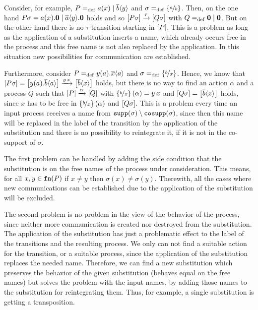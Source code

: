 Consider, for example, $P=_{\mathrm{def}}a(x) \mid \overline{b}\langle y\rangle$ and $\sigma=_{\mathrm{def}}\left\{\nicefrac{a}{b}\right\}$. Then, on the one hand $P\sigma=a(x).\mathbf{0} \mid \overline{a}\langle y\rangle.\mathbf{0}$ holds and so $\left[P\sigma\right]\xrightarrow{\tau}\left[Q\sigma\right]$ with $Q=_{\mathrm{def}}\mathbf{0} \mid \mathbf{0}$. But on the other hand there is no $\tau$ transition starting in $\left[P\right]$. This is a problem as long as the application of a substitution inserts a name, which already occurs free in the process and this free name is not also replaced by the application. In this situation new possibilities for communication are established.

Furthermore, consider $P=_{\mathrm{def}}y(a).\overline{x}\langle a\rangle$ and $\sigma=_{\mathrm{def}}\left\{\nicefrac{b}{x}\right\}$. Hence, we know that $\left[P\sigma\right]=\left[y(a).\overline{b}\langle a\rangle\right]\xrightarrow{y\,x}\left[\overline{b}\langle x\rangle\right]$ holds, but there is no way to find an action $\alpha$ and a process $Q$ such that $\left[P\right]\xrightarrow{\alpha}\left[Q\right]$ with $\left\{\nicefrac{b}{x}\right\}(\alpha)=y\,x$ and $\left[Q\sigma\right]=\left[\overline{b}\langle x\rangle\right]$ holds, since $x$ has to be free in $\left\{\nicefrac{b}{x}\right\}(\alpha)$ and $\left[Q\sigma\right]$. This is a problem every time an input process receives a name from $\mathtt{supp}(\sigma)\setminus\mathtt{cosupp}(\sigma)$, since then this name will be replaced in the label of the transition by the application of the substitution and there is no possibility to reintegrate it, if it is not in the co-support of $\sigma$.

The first problem can be handled by adding the side condition that the substitution is  on the free names of the process under consideration. This means, for all $x,y\in\mathtt{fn}(P)$ if $x\neq{}y$ then $\sigma(x)\neq\sigma(y)$. Therewith, all the cases where new communications can be established due to the application of the substitution will be excluded.

The second problem is no problem in the view of the behavior of the process, since neither more communication is created nor destroyed from the substitution. The application of the substitution has just a problematic effect to the label of the transitions and the resulting process. We only can not find a suitable action for the transition, or a suitable process, since the application of the substitution replaces the needed name. Therefore, we can find a new substitution which preserves the behavior of the given substitution (behaves equal on the free names) but solves the problem with the input names, by adding those names to the substitution for reintegrating them. Thus, for example, a single substitution is getting a transposition.

